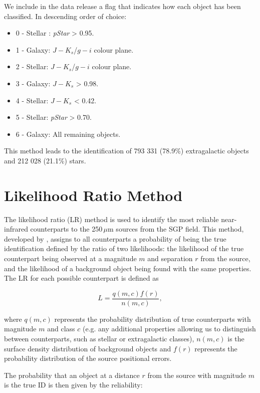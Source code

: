 \documentclass[fleqn,usenatbib]{mnras}
\begin{document}
We include in the data release a flag that indicates how each object has been classified. In descending order of choice:

\begin{itemize}
	\item 0 - Stellar : \textit{pStar} > 0.95.
	\item 1 - Galaxy: $J - K_s$/$g - i$ colour plane.
	\item 2 - Stellar: $J - K_s$/$g - i$ colour plane.
	\item 3 - Galaxy: $J - K_s$ > 0.98.
	\item 4 - Stellar: $J - K_s$ < 0.42.
	\item 5 - Stellar: \textit{pStar} > 0.70.
	\item 6 - Galaxy: All remaining objects.
\end{itemize}

This method leads to the identification of 793 331 (78.9\%) extragalactic objects and 212 028 (21.1\%) stars.

\section{Likelihood Ratio Method}
\label{sec:likeihood_ratio_method}

The likelihood ratio (LR) method is used to identify the most reliable near-infrared counterparts to the 250\,$\mu$m sources from the SGP field. This method, developed by \citealt{Sutherland_1992}, assigns to all counterparts a probability of being the true identification defined by the ratio of two likelihoods: the likelihood of the true counterpart being observed at a magnitude $m$ and separation $r$ from the source, and the likelihood of a background object being found with the same properties. The LR for each possible counterpart is defined as

\begin{equation}
\label{eq:likelihood}
L = \frac{q(m, c) f(r)}{n(m, c)},
\end{equation}

\noindent where $q(m, c)$ represents the probability distribution of true counterparts with magnitude $m$ and class $c$ (e.g. any additional properties allowing us to distinguish between counterparts, such as stellar or extragalactic classes), $n(m, c)$ is the surface density distribution of background objects and $f(r)$ represents the probability distribution of the source positional errors.

The probability that an object at a distance $r$ from the source with magnitude $m$ is the true ID is then given by the reliability:
\end{document}
